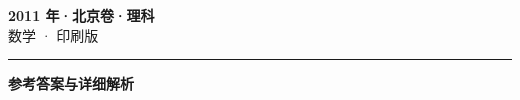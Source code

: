 \documentclass[zihao=5, a4paper]{ctexart}
\begin{document}
\begin{center}
  {\Large\bfseries 2011 年·北京卷·理科}\\[4pt]
  {\large 数学 · 印刷版}
\end{center}
\medskip
{}

\par\bigskip\hrule\bigskip
{}
\begin{center}{\large\bfseries 参考答案与详细解析}\end{center}
\smallskip

\end{document}

